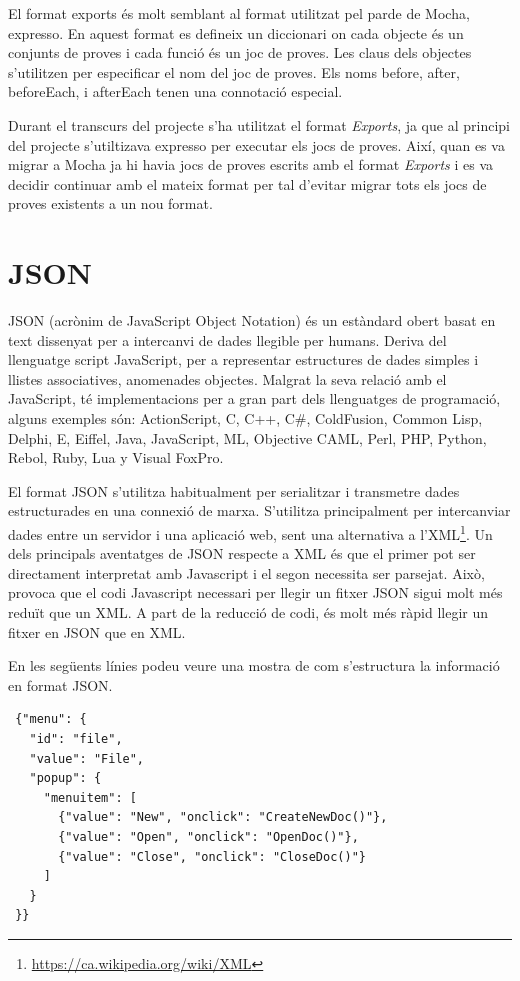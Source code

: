 El format exports és molt semblant al format utilitzat pel parde de Mocha, expresso. En aquest format es defineix un diccionari on cada objecte és un conjunts de proves i cada funció és un joc de proves. Les claus dels objectes s'utilitzen per especificar el nom del joc de proves. Els noms before, after, beforeEach, i afterEach tenen una connotació especial. 

Durant el transcurs del projecte s'ha utilitzat el format \emph{Exports}, ja que al principi del projecte s'utiltizava expresso per executar els jocs de proves. Així, quan es va migrar a Mocha ja hi havia jocs de proves escrits amb el format \emph{Exports} i es va decidir continuar amb el mateix format per tal d'evitar migrar tots els jocs de proves existents a un nou format. 

\section{JSON}
\label{sec:json}

JSON (acrònim de JavaScript Object Notation) és un estàndard obert basat en text dissenyat per a intercanvi de dades llegible per humans. Deriva del llenguatge script JavaScript, per a representar estructures de dades simples i llistes associatives, anomenades objectes. Malgrat la seva relació amb el JavaScript, té implementacions per a gran part dels llenguatges de programació, alguns exemples són: ActionScript, C, C++, C\#, ColdFusion, Common Lisp, Delphi, E, Eiffel, Java, JavaScript, ML, Objective CAML, Perl, PHP, Python, Rebol, Ruby, Lua y Visual FoxPro. 

El format JSON s'utilitza habitualment per serialitzar i transmetre dades estructurades en una connexió de marxa. S'utilitza principalment per intercanviar dades entre un servidor i una aplicació web, sent una alternativa a l'XML\footnote{\url{https://ca.wikipedia.org/wiki/XML}}. Un dels principals aventatges de JSON respecte a XML és que el primer pot ser directament interpretat amb Javascript i el segon necessita ser parsejat. Això, provoca que el codi Javascript necessari per llegir un fitxer JSON sigui molt més reduït que un XML. A part de la reducció de codi, és molt més ràpid llegir un fitxer en JSON que en XML. 

En les següents línies podeu veure una mostra de com s'estructura la informació en format JSON. 

\begin{lstlisting}
 {"menu": {
   "id": "file",
   "value": "File",
   "popup": {
     "menuitem": [
       {"value": "New", "onclick": "CreateNewDoc()"},
       {"value": "Open", "onclick": "OpenDoc()"},
       {"value": "Close", "onclick": "CloseDoc()"}
     ]
   }
 }}
\end{lstlisting}


